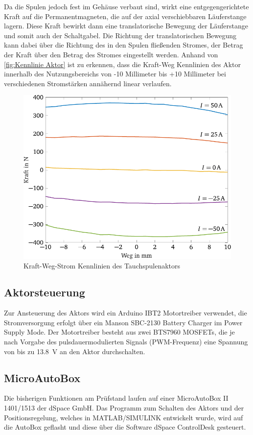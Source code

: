 Da die Spulen jedoch fest im Gehäuse verbaut sind, wirkt eine entgegengerichtete Kraft auf die Permanentmagneten, die auf der axial verschiebbaren Läuferstange lagern. Diese Kraft bewirkt dann eine translatorische Bewegung der Läuferstange und somit auch der Schaltgabel. Die Richtung der translatorischen Bewegung kann dabei über die Richtung des in den Spulen fließenden Stromes, der Betrag der Kraft über den Betrag des Stromes eingestellt werden.
Anhand von \autoref{fig:Kennlinie Aktor} ist zu erkennen, dass die Kraft-Weg Kennlinien des Aktor innerhalb des Nutzungsbereichs von -10 Millimeter bis +10 Millimeter bei verschiedenen Stromstärken annähernd linear verlaufen. \\

\begin{figure}[h]
	\centering
		\includegraphics[width=0.6\columnwidth]{Bilder/KennlinieAktor.pdf}
	\caption{Kraft-Weg-Strom Kennlinien des Tauchspulenaktors \cite[S.12]{adp}}
	\label{fig:Kennlinie Aktor}
\end{figure} \noindent

\subsection{Aktorsteuerung}
Zur Ansteuerung des Aktors wird ein Arduino IBT2 Motortreiber verwendet, die Stromversorgung erfolgt über ein Manson SBC-2130 Battery Charger im Power Supply Mode. Der Motortreiber besteht aus zwei BTS7960 MOSFETs, die je nach Vorgabe des pulsdauermodulierten Signals (PWM-Frequenz) eine Spannung von bis zu \SI{13,8}{V} an den Aktor durchschalten. 

\subsection{MicroAutoBox}
Die bisherigen Funktionen am Prüfstand laufen auf einer MicroAutoBox II 1401/1513 der dSpace GmbH. Das Programm zum Schalten des Aktors und der Positionsregelung, welches in MATLAB/SIMULINK entwickelt wurde, wird auf die AutoBox geflasht und diese über die Software dSpace ControlDesk gesteuert.

